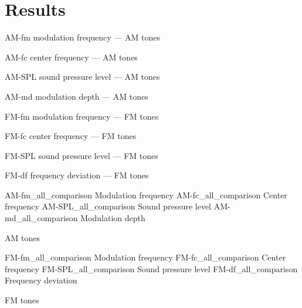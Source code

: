 \documentclass[../main.tex]{subfiles}
\begin{document}
\chapter{Results}

\begin{results}

\myfigurefastlexpstds%
  {AM-fm}
  {modulation frequency --- AM tones}

\myfigurefastlexpstds%
  {AM-fc}
  {center frequency --- AM tones}

\myfigurefastlexpstds%
  {AM-SPL}
  {sound pressure level --- AM tones}

\myfigurefastlexpstds%
  {AM-md}
  {modulation depth --- AM tones}

\myfigurefastlexpstds%
  {FM-fm}
  {modulation frequency --- FM tones}

\myfigurefastlexpstds%
  {FM-fc}
  {center frequency --- FM tones}

\myfigurefastlexpstds%
  {FM-SPL}
  {sound pressure level --- FM tones}

\myfigurefastlexpstds%
  {FM-df}
  {frequency deviation --- FM tones}



\myfigurequad%
  {AM-fm_all_comparison}
  {Modulation frequency}
  {AM-fc_all_comparison}
  {Center frequency}
  {AM-SPL_all_comparison}
  {Sound pressure level}
  {AM-md_all_comparison}
  {Modulation depth}
  {
    \caption{AM tones}
    \label{fig:AM-comparison}
  }

\myfigurequad%
  {FM-fm_all_comparison}
  {Modulation frequency}
  {FM-fc_all_comparison}
  {Center frequency}
  {FM-SPL_all_comparison}
  {Sound pressure level}
  {FM-df_all_comparison}
  {Frequency deviation}
  {
    \caption{FM tones}
    \label{fig:FM-comparison}
  }

\end{results}
\end{document}
